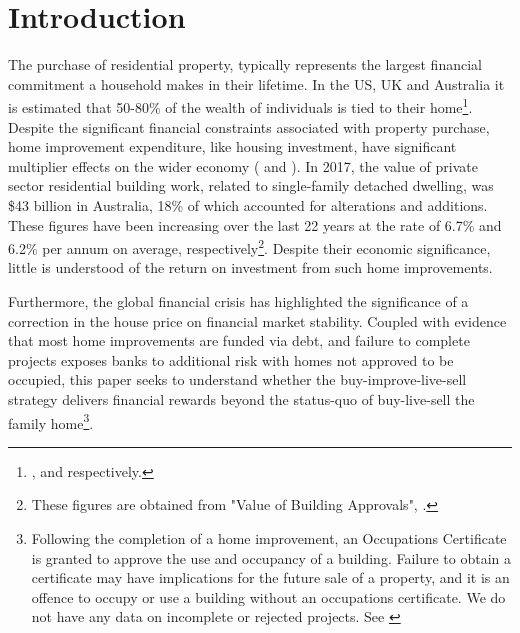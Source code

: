 \documentclass[AEJ,reqno, draftmode]{AEA} %
\begin{document}
\maketitle{}


\section{Introduction}

The purchase of residential property, typically represents the largest financial commitment a household makes in their lifetime. In the US, UK and Australia it is estimated that 50-80\% of the wealth of individuals is tied to their home\footnote{\citet{fed}, \citet{allocuk} and \citet{hilda} respectively.}. Despite the significant financial constraints associated with property purchase, home improvement expenditure, like housing investment, have significant multiplier effects on the wider economy (\cite{miles1992housing} and \cite{meffect}). In 2017, the value of private sector residential building work, related to single-family detached dwelling, was \$43 billion in Australia, 18\% of which accounted for alterations and additions. These figures have been increasing over the last 22 years at the rate of 6.7\% and 6.2\% per annum on average, respectively\footnote{These figures are obtained from "Value of Building Approvals", \citet{abs1}.}.  Despite their economic significance, little is understood of the return on investment from such home improvements. 




Furthermore, the global financial crisis has highlighted the significance of a correction in the house price on financial market stability. Coupled with evidence that most home improvements are funded via debt, and failure to complete projects exposes banks to additional risk with homes not approved to be occupied, this paper seeks to understand whether the buy-improve-live-sell strategy delivers financial rewards beyond the status-quo of buy-live-sell the family home\footnote{Following the completion of a home improvement, an Occupations Certificate is granted to approve the use and occupancy of a building. Failure to obtain a certificate may have implications for the future sale of a property, and it is an offence to occupy or use a building without an occupations certificate. We do not have any data on incomplete or rejected projects. See \citet{fair}}.
\end{document}
